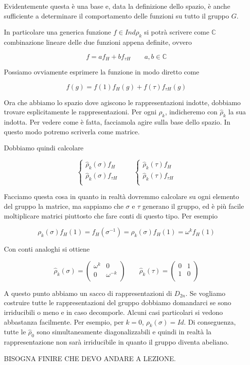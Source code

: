 \documentclass[11pt]{article}
\theoremstyle{plain}
\theoremstyle{definition}
\theoremstyle{remark}
\newcommand{\C}{\mathbb{C}}
\begin{document}
Evidentemente questa è una base e, data la definizione dello spazio, è anche sufficiente a determinare il comportamento delle funzioni su tutto il gruppo $G$.

In particolare una generica funzione $f \in Ind \rho_k$ si potrà scrivere come $\C$ combinazione lineare delle due funzioni appena definite, ovvero

\[ f = a f_H + b f_{\tau H} \qquad a,b \in \C\]


Possiamo ovviamente esprimere la funzione in modo diretto come

\[ f(g) = f(1) f_H(g) + f(\tau) f_{\tau H} (g) \]

Ora che abbiamo lo spazio dove agiscono le rappresentazioni indotte, dobbiamo trovare esplicitamente le rappresentazioni. Per ogni $\rho_k$, indicheremo con $\hat \rho_k$ la sua indotta. Per vedere come è fatta, facciamola agire sulla base dello spazio. In questo modo potremo scriverla come matrice.

Dobbiamo quindi calcolare

\[ 
\begin{cases}
\hat \rho_k (\sigma) f_H \\ 
\hat \rho_k (\sigma) f_{\tau H} \\
\end{cases}
\qquad
\begin{cases}
\hat \rho_k (\tau) f_H \\
\hat \rho_k (\tau) f_{\tau H}\\
\end{cases}
\]

Facciamo questa cosa in quanto in realtà dovremmo calcolare su ogni elemento del gruppo la matrice, ma sappiamo che $\sigma$ e $\tau$ generano il gruppo, ed è più facile moltiplicare matrici piuttosto che fare conti di questo tipo.  Per esempio


\[ 
\hat \rho_k (\sigma) f_H(1) = f_H(\sigma^{-1}) = \rho_k(\sigma) f_H(1) = \omega^k f_H(1)
\]

Con conti analoghi si ottiene


\[ 
\hat \rho_k (\sigma) = 
\left(
\begin{array}{cc}
\omega^k & 0 \\
0 & \omega^{-k} \\
\end{array}
\right)
\qquad
\hat \rho_k (\tau) = 
\left(
\begin{array}{cc}
0 & 1 \\
1 & 0 \\
\end{array}
\right)
\]


A questo punto abbiamo un sacco di rappresentazioni di $D_{2n}$. Se vogliamo costruire tutte le rappresentazioni del gruppo dobbiamo domandarci se sono irriducibili o meno e in caso decomporle. Alcuni casi particolari si vedono abbastanza facilmente. Per esempio, per $k=0$, $\hat \rho_k(\sigma) = Id$. Di conseguenza, tutte le $\hat \rho_0$ sono simultaneamente diagonalizzabili e quindi in realtà la rappresentazione non sarà irriducibile in quanto il gruppo diventa abeliano.



BISOGNA FINIRE CHE DEVO ANDARE A LEZIONE.
\end{document}
